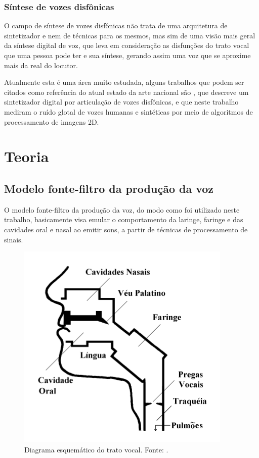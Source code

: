 \documentclass[
  12pt,       
  openright,      
  twoside,      
  a4paper,      
  english,      
  french,       
  spanish,      
  brazil,     
  ]{abntex2}
\begin{document}
\subsection{Síntese de vozes disfônicas}
O campo de síntese de vozes disfônicas não trata de uma arquitetura de sintetizador e nem de técnicas para os mesmos, mas sim de uma visão mais geral da síntese digital de voz, que leva em consideração as disfunções do trato vocal que uma pessoa pode ter e sua síntese, gerando assim uma voz que se aproxime mais da real do locutor.

Atualmente esta é uma área muito estudada, alguns trabalhos que podem ser citados como referência do atual estado da arte nacional são , que descreve um sintetizador digital por articulação de vozes disfônicas, e  que neste trabalho mediram o ruído glotal de vozes humanas e sintéticas por meio de algoritmos de processamento de imagens 2D.

\chapter{Teoria}
\label{sec:teoria}
\section{Modelo fonte-filtro da produção da voz}
\label{subsec:fonteFiltro}
O modelo fonte-filtro da produção da voz, do modo como foi utilizado neste trabalho, basicamente visa emular o comportamento da laringe, faringe e das cavidades oral e nasal ao emitir sons, a partir de técnicas de processamento de sinais.

\begin{figure}
\centering
\includegraphics[scale=0.6]{imagens/trato_vocal.PNG}
\caption{Diagrama esquemático do trato vocal. Fonte: .}
\label{fig:tratoVocal}
\centering
\end{figure}
\end{document}
